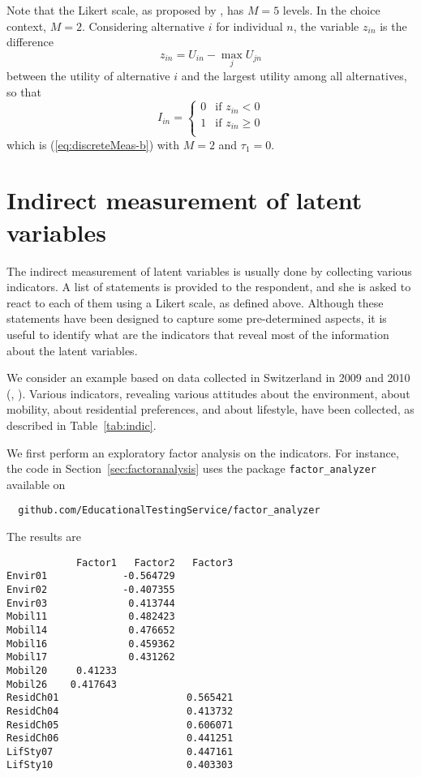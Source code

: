\documentclass[12pt,a4paper]{article}
\newcommand{\req}[1]{(\ref{#1})}
\begin{document}
Note that the Likert scale, as proposed by
, has $M=5$ levels. In the choice
context, $M=2$. Considering alternative $i$ for individual $n$,
the variable $z_{in}$ is the difference
\begin{equation}
z_{in} = U_{in} - \max_{j} U_{jn}
\end{equation}
 between the utility of alternative $i$ and the largest utility among all
alternatives, so that
\begin{equation}
I_{in}= \left\{
\begin{array}{ll}  
0 & \text{if } z_{in} < 0 \\
1 & \text{if } z_{in} \geq 0 \\
\end{array}
\right.
\end{equation}
which is \req{eq:discreteMeas-b} with $M=2$ and $\tau_1=0$.


\section{Indirect measurement of latent variables}

The indirect measurement of latent variables is usually done by
collecting various indicators. A list of statements is provided to the
respondent, and she is asked to react to each of them using a Likert scale, as
defined above. Although these statements have been designed to capture
some pre-determined aspects, it is useful to identify what are the
indicators that reveal most of the information about the latent
variables. 

We consider an example based on data collected in Switzerland in 2009
and 2010 (\cite{AtaGleBier_ICMC2011}, \cite{AtaGlerBier2012_DISP}). Various indicators, revealing various attitudes about the
environment, about mobility, about residential preferences, and about
lifestyle, have been collected, as described in Table~\ref{tab:indic}.

We first perform an exploratory factor analysis on the indicators. For
instance, the code in Section~\ref{sec:factoranalysis} uses the
package \verb+factor_analyzer+ available on
\begin{lstlisting}
  github.com/EducationalTestingService/factor_analyzer
\end{lstlisting}
The results are
\begin{lstlisting}
            Factor1   Factor2   Factor3
Envir01             -0.564729
Envir02             -0.407355
Envir03              0.413744
Mobil11              0.482423
Mobil14              0.476652
Mobil16              0.459362
Mobil17              0.431262
Mobil20     0.41233
Mobil26    0.417643
ResidCh01                      0.565421
ResidCh04                      0.413732
ResidCh05                      0.606071
ResidCh06                      0.441251
LifSty07                       0.447161
LifSty10                       0.403303
\end{lstlisting}
\end{document}
